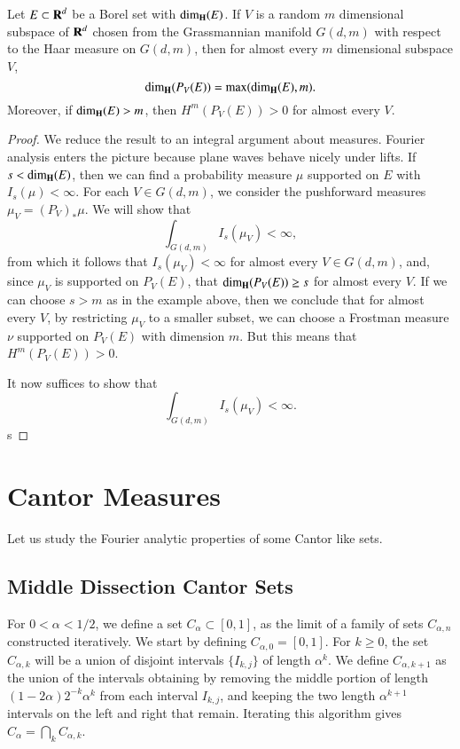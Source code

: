 \begin{theorem}
  Let $E \subset \operatorname{\mathbf{R}}^d$ be a Borel set with $\operatorname{\dim_{\mathbf{H}}}(E)$. If $V$ is a random $m$ dimensional subspace of $\operatorname{\mathbf{R}}^d$ chosen from the Grassmannian manifold $G(d,m)$ with respect to the Haar measure on $G(d,m)$, then for almost every $m$ dimensional subspace $V$,
  \[ \operatorname{\dim_{\mathbf{H}}}(P_V(E)) = \max(\operatorname{\dim_{\mathbf{H}}}(E), m). \]
  Moreover, if $\operatorname{\dim_{\mathbf{H}}}(E) > m$, then $H^m(P_V(E)) > 0$ for almost every $V$.
\end{theorem}
\begin{proof}
  We reduce the result to an integral argument about measures. Fourier analysis enters the picture because plane waves behave nicely under lifts. If $s < \operatorname{\dim_{\mathbf{H}}}(E)$, then we can find a probability measure $\mu$ supported on $E$ with $I_s(\mu) < \infty$. For each $V \in G(d,m)$, we consider the pushforward measures $\mu_V = (P_V)_* \mu$. We will show that
  \[ \int_{G(d,m)} I_s(\mu_V) < \infty, \]
  from which it follows that $I_s(\mu_V) < \infty$ for almost every $V \in G(d,m)$, and, since $\mu_V$ is supported on $P_V(E)$, that $\operatorname{\dim_{\mathbf{H}}}(P_V(E)) \geq s$ for almost every $V$. If we can choose $s > m$ as in the example above, then we conclude that for almost every $V$, by restricting $\mu_V$ to a smaller subset, we can choose a Frostman measure $\nu$ supported on $P_V(E)$ with dimension $m$. But this means that $H^m(P_V(E)) > 0$.

  It now suffices to show that
  \[ \int_{G(d,m)} I_s(\mu_V) < \infty. \]
  s
\end{proof}






\chapter{Cantor Measures}

Let us study the Fourier analytic properties of some Cantor like sets.

\section{Middle Dissection Cantor Sets}

For $0 < \alpha < 1/2$, we define a set $C_\alpha \subset [0,1]$, as the limit of a family of sets $C_{\alpha,n}$ constructed iteratively. We start by defining $C_{\alpha,0} = [0,1]$. For $k \geq 0$, the set $C_{\alpha,k}$ will be a union of disjoint intervals $\{ I_{k,j} \}$ of length $\alpha^k$. We define $C_{\alpha,k+1}$ as the union of the intervals obtaining by removing the middle portion of length $(1 - 2\alpha) 2^{-k} \alpha^k$ from each interval $I_{k,j}$, and keeping the two length $\alpha^{k+1}$ intervals on the left and right that remain. Iterating this algorithm gives $C_\alpha = \bigcap_k C_{\alpha,k}$.

